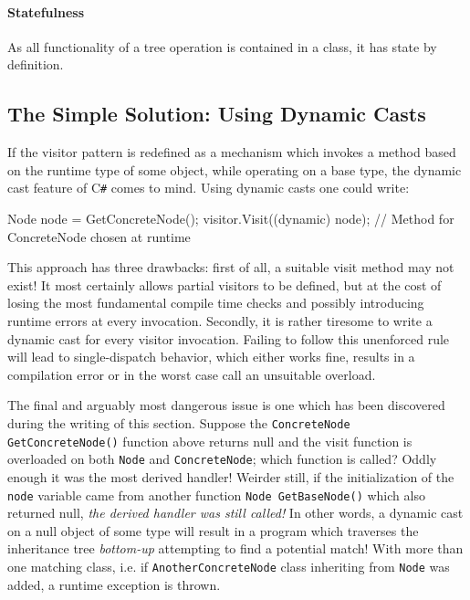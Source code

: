 \documentclass[twoside,openright]{uva-bachelor-thesis}
\newcommand{\code}[1]{\texttt{\footnotesize#1}}
\newcommand{\cs}{C\texttt{\#}\xspace}
\begin{document}
			\paragraph{Statefulness}
				As all functionality of a tree operation is contained in a class, it has state by definition. 
			
		\subsection{The Simple Solution: Using Dynamic Casts}
			If the visitor pattern is redefined as a mechanism which invokes a method based on the runtime type of some object, while operating on a base type, the dynamic cast feature of \cs comes to mind. Using dynamic casts one could write:
			
			\begin{codespan}
				\begin{csharpcode}
					Node node = GetConcreteNode();
					visitor.Visit((dynamic) node); // Method for ConcreteNode chosen at runtime
				\end{csharpcode}
			\end{codespan}
			
			This approach has three drawbacks: first of all, a suitable visit method may not exist! It most certainly allows partial visitors to be defined, but at the cost of losing the most fundamental compile time checks and possibly introducing runtime errors at every invocation. Secondly, it is rather tiresome to write a dynamic cast for every visitor invocation. Failing to follow this unenforced rule will lead to single-dispatch behavior, which either works fine, results in a compilation error or in the worst case call an unsuitable overload.
			
			The final and arguably most dangerous issue is one which has been discovered during the writing of this section. Suppose the \code{ConcreteNode GetConcreteNode()} function above returns null and the visit function is overloaded on both \code{Node} and \code{ConcreteNode}; which function is called? Oddly enough it was the most derived handler! Weirder still, if the initialization of the \code{node} variable came from another function \code{Node GetBaseNode()} which also returned null, \emph{the derived handler was still called!} In other words, a dynamic cast on a null object of some type will result in a program which traverses the inheritance tree \emph{bottom-up} attempting to find a potential match! With more than one matching class, i.e. if \code{AnotherConcreteNode} class inheriting from \code{Node} was added, a runtime exception is thrown.
			
\end{document}
